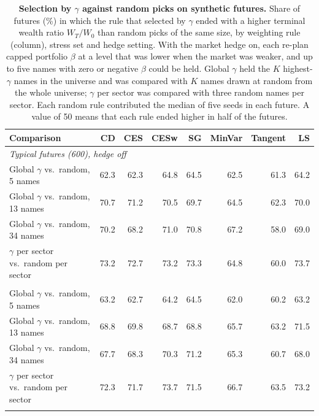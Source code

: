 \begin{table}[H]
\centering
\small
\setlength{\tabcolsep}{4pt}
\caption{\textbf{Selection by $\gamma$ against random picks on synthetic futures.} Share of futures (\%) in which
the rule that selected by $\gamma$ ended with a higher terminal wealth ratio $W_T/W_0$ than random picks of the
same size, by weighting rule (column), stress set and hedge setting. With the market hedge on, each re-plan capped portfolio $\beta$ at a level that was lower when the market was weaker, and up to five names with zero or negative $\beta$ could be held. Global $\gamma$ held the $K$ highest-$\gamma$
names in the universe and was compared with $K$ names drawn at random from the whole universe; $\gamma$ per sector
was compared with three random names per sector. Each random rule contributed the median of five seeds in each
future. A value of 50 means that each rule ended higher in half of the futures.}
\label{tab:S-head-to-head}
\begin{tabular}{l*{7}{r}}
\toprule
Comparison & CD & CES & CESw & SG & MinVar & Tangent & LS \\
\midrule
\multicolumn{8}{l}{\emph{Typical futures (600), hedge off}} \\
Global $\gamma$ vs.\ random, 5 names & 62.3 & 62.3 & 64.8 & 64.5 & 62.5 & 61.3 & 64.2 \\
Global $\gamma$ vs.\ random, 13 names & 70.7 & 71.2 & 70.5 & 69.7 & 64.5 & 62.3 & 70.0 \\
Global $\gamma$ vs.\ random, 34 names & 70.2 & 68.2 & 71.0 & 70.8 & 67.2 & 58.0 & 69.0 \\
$\gamma$ per sector vs.\ random per sector & 73.2 & 72.7 & 73.2 & 73.3 & 64.8 & 60.0 & 73.7 \\
\addlinespace
\multicolumn{8}{l}{\emph{Typical futures (600), hedge on}} \\
Global $\gamma$ vs.\ random, 5 names & 63.2 & 62.7 & 64.2 & 64.5 & 62.0 & 60.2 & 63.2 \\
Global $\gamma$ vs.\ random, 13 names & 68.8 & 69.8 & 68.7 & 68.8 & 65.7 & 63.2 & 71.5 \\
Global $\gamma$ vs.\ random, 34 names & 67.7 & 68.3 & 70.3 & 71.2 & 65.3 & 60.7 & 68.0 \\
$\gamma$ per sector vs.\ random per sector & 72.3 & 71.7 & 73.7 & 71.5 & 66.7 & 63.5 & 73.2 \\
\addlinespace
\multicolumn{8}{l}{\emph{Burst stress (200), hedge off}} \\

\end{tabular}
\end{table}
